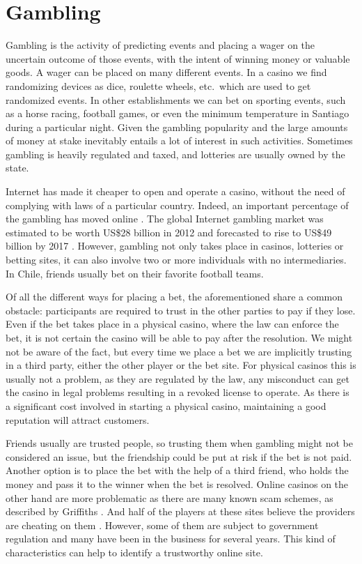 \section{Gambling} \label{gambling}
Gambling is the activity of predicting events and placing a wager on the
  uncertain outcome of those events, with the intent of winning money or
  valuable goods.
A wager can be placed on many different events. In a casino we find randomizing
  devices as dice, roulette wheels, etc.\ which are used to get randomized
  events. In other establishments we can bet on sporting events, such as a horse
  racing, football games,  or even the minimum temperature in Santiago during a
  particular night.
Given the gambling popularity and the large amounts of money at stake inevitably
  entails a lot of interest in such activities.
Sometimes gambling is heavily regulated and taxed, and lotteries are usually
  owned by the state.

Internet has made it cheaper to open and operate a casino, without the need of
  complying with laws of a particular country.
Indeed, an important percentage of the gambling
  has moved online \cite{shelat2002makes,griffiths2008internet}.
The global Internet gambling market was estimated to be worth US\$28 billion in
  2012 and forecasted to rise to US\$49 billion by 2017%
  \cite{gainsbury2015risky}.
However, gambling not only takes place in casinos, lotteries or betting sites,
  it can also involve two or more individuals with no intermediaries.
In Chile, friends usually bet on their favorite football teams.

Of all the different ways for placing a bet, the aforementioned share a common
  obstacle: participants are required to trust in the other parties to pay if
  they lose.
Even if the bet takes place in a physical casino, where the law can enforce
  the bet, it is not certain the casino will be able to pay after the
  resolution.
We might not be aware of the fact, but every time we place a bet we are
  implicitly trusting in a third party, either the other player or the bet
  site. For physical casinos this is usually not a problem, as they are
  regulated by the law, any misconduct can get the casino in legal problems
  resulting in a revoked license to operate.
As there is a significant cost involved in starting a physical casino,
  maintaining a good reputation will attract customers.

Friends usually are trusted people, so trusting them when gambling might not
  be considered an issue, but the friendship could be put at risk if the bet
  is not paid. Another option is to place the bet with the help  of a third
  friend, who holds the money and pass it to the winner when the bet is
  resolved.
Online casinos on the other hand are more problematic as there are many known
  scam schemes, as described by Griffiths \cite{griffiths2010crime}. And
  half of the players at these sites believe the providers are cheating on
  them \cite{mcmullan2010online}. However, some of them are subject to
  government regulation and many have been in the business for several years.
This kind of characteristics can help to identify a trustworthy online site.

